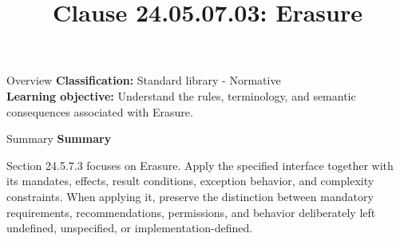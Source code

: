 \documentclass[10pt,letterpaper]{article}
\title{Clause 24.05.07.03: Erasure}
\author{}
\date{}
\begin{document}
\maketitle
\begin{CornellOverviewBox}{Overview}
\textbf{Classification:} Standard library - Normative\\[2pt]
\textbf{Learning objective:} Understand the rules, terminology, and semantic consequences associated with Erasure.
\end{CornellOverviewBox}\begin{CornellSummaryBox}{Summary}
{\sffamily\bfseries\color{Accent} Summary}\par\vspace{3pt}Section 24.5.7.3 focuses on Erasure. Apply the specified interface together with its mandates, effects, result conditions, exception behavior, and complexity constraints. When applying it, preserve the distinction between mandatory requirements, recommendations, permissions, and behavior deliberately left undefined, unspecified, or implementation-defined.
\end{CornellSummaryBox}
\end{document}
